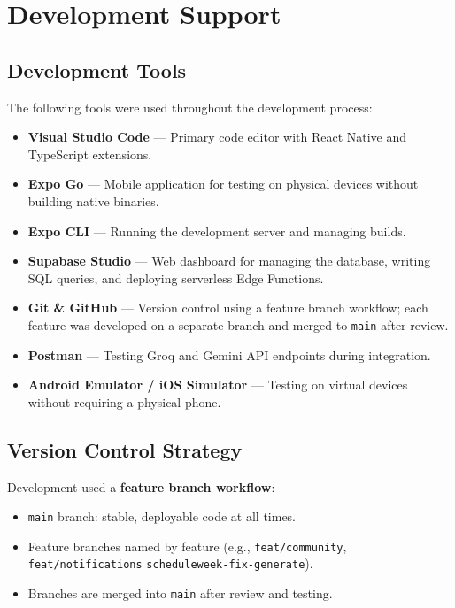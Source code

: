 \section{Development Support}

\subsection{Development Tools}

The following tools were used throughout the development process:

\begin{itemize}
    \item \textbf{Visual Studio Code} — Primary code editor with React Native
    and TypeScript extensions.
    \item \textbf{Expo Go} — Mobile application for testing on physical devices
    without building native binaries.
    \item \textbf{Expo CLI} — Running the development server and managing
    builds.
    \item \textbf{Supabase Studio} — Web dashboard for managing the database,
    writing SQL queries, and deploying serverless Edge Functions.
    \item \textbf{Git \& GitHub} — Version control using a feature branch
    workflow; each feature was developed on a separate branch and merged to
    \texttt{main} after review.
    \item \textbf{Postman} — Testing Groq and Gemini API endpoints during
    integration.
    \item \textbf{Android Emulator / iOS Simulator} — Testing on virtual
    devices without requiring a physical phone.
\end{itemize}

\subsection{Version Control Strategy}

Development used a \textbf{feature branch workflow}:
\begin{itemize}
    \item \texttt{main} branch: stable, deployable code at all times.
    \item Feature branches named by feature
    (e.g., \texttt{feat/community}, \texttt{feat/notifications} \texttt{scheduleweek-fix-generate}).
    \item Branches are merged into \texttt{main} after review and testing.
\end{itemize}

